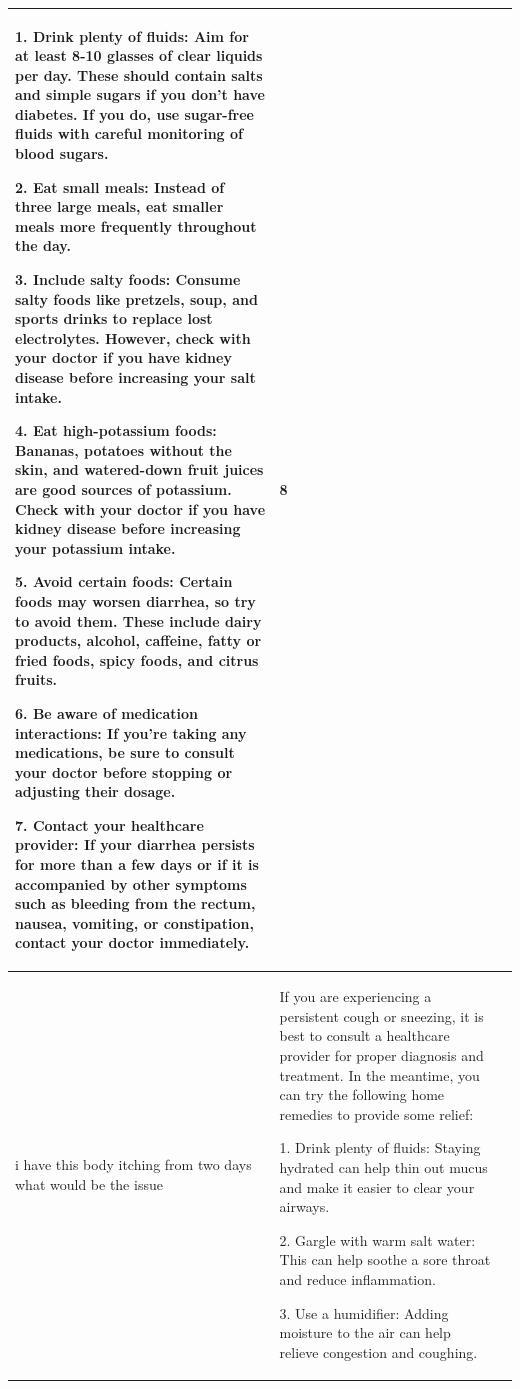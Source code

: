 \begin{longtable}{|p{3.5cm}|p{9.1cm}|c|}
                1. Drink plenty of fluids: Aim for at least 8-10 glasses of clear liquids per day. These should contain salts and simple sugars if you don't have diabetes. If you do, use sugar-free fluids with careful monitoring of blood sugars.
                
                2. Eat small meals: Instead of three large meals, eat smaller meals more frequently throughout the day.
                
                3. Include salty foods: Consume salty foods like pretzels, soup, and sports drinks to replace lost electrolytes. However, check with your doctor if you have kidney disease before increasing your salt intake.
                
                4. Eat high-potassium foods: Bananas, potatoes without the skin, and watered-down fruit juices are good sources of potassium. Check with your doctor if you have kidney disease before increasing your potassium intake.
                
                5. Avoid certain foods: Certain foods may worsen diarrhea, so try to avoid them. These include dairy products, alcohol, caffeine, fatty or fried foods, spicy foods, and citrus fruits.
                
                6. Be aware of medication interactions: If you're taking any medications, be sure to consult your doctor before stopping or adjusting their dosage.
                
                7. Contact your healthcare provider: If your diarrhea persists for more than a few days or if it is accompanied by other symptoms such as bleeding from the rectum, nausea, vomiting, or constipation, contact your doctor immediately.
                & 8 \\ 
        \hline
         i have this body itching from two days what would be the issue &   If you are experiencing a persistent cough or sneezing, it is best to consult a healthcare provider for proper diagnosis and treatment. In the meantime, you can try the following home remedies to provide some relief:
        
                1. Drink plenty of fluids: Staying hydrated can help thin out mucus and make it easier to clear your airways.
                
                2. Gargle with warm salt water: This can help soothe a sore throat and reduce inflammation.
                
                3. Use a humidifier: Adding moisture to the air can help relieve congestion and coughing.
                

\end{longtable}
